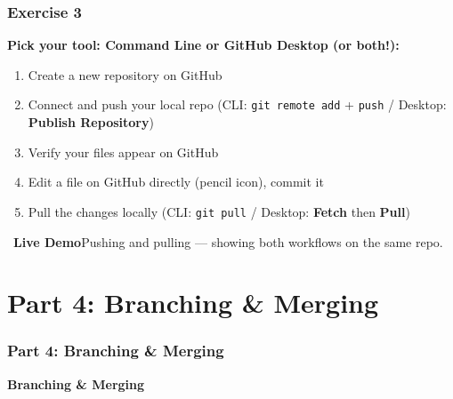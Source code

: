 \documentclass{beamer}
\newcommand{\livedemo}[1]{\begin{alertblock}{\faDesktop\ \textbf{Live Demo}}#1\end{alertblock}}
\begin{document}
\begin{frame}
\frametitle{Exercise 3}
\textbf{Pick your tool: Command Line or GitHub Desktop (or both!):}
\begin{enumerate}
    \item Create a new repository on GitHub
    \item Connect and push your local repo (CLI: \texttt{git remote add} + \texttt{push} / Desktop: \textbf{Publish Repository})
    \item Verify your files appear on GitHub
    \item Edit a file on GitHub directly (pencil icon), commit it
    \item Pull the changes locally (CLI: \texttt{git pull} / Desktop: \textbf{Fetch} then \textbf{Pull})
\end{enumerate}
\livedemo{Pushing and pulling --- showing both workflows on the same repo.}
\end{frame}

\section{Part 4: Branching \& Merging}

\begin{frame}
\frametitle{Part 4: Branching \& Merging}
\centering
\Large \textbf{Branching \& Merging}\\[6pt]
\end{frame}
\end{document}
